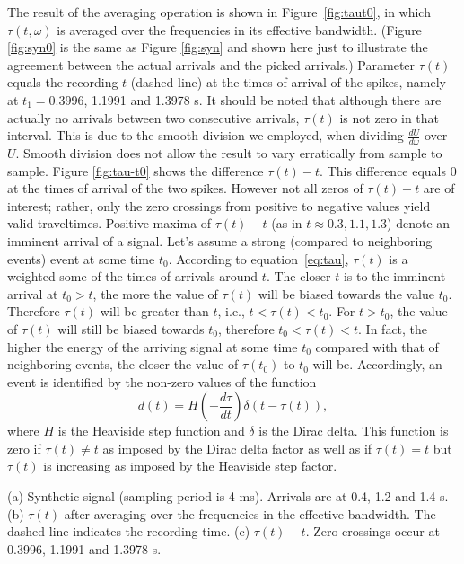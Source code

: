 The result of the averaging operation is shown in Figure~\ref{fig:taut0}, in which $\tau(t,\omega)$ is averaged over the frequencies in its effective bandwidth. (Figure \ref{fig:syn0} is the same as Figure \ref{fig:syn} and shown here just to illustrate the agreement between the actual arrivals and the picked arrivals.) Parameter $\tau(t)$ equals the recording $t$ (dashed line) at the times of arrival of the spikes, namely at $t_1=0.3996$, 1.1991 and 1.3978 s. It should be noted that although there are actually no arrivals between two consecutive arrivals, $\tau(t)$ is not zero in that interval. This is due to the smooth division we employed, when dividing $\frac{dU}{d\omega}$ over $U$. Smooth division does not allow the result to vary erratically from sample to sample. 
Figure \ref{fig:tau-t0} shows the difference $\tau(t)-t$. This difference equals 0 at the times of arrival of the two spikes. 
However not all zeros of $\tau(t)-t$ are of interest; rather, only the zero crossings from positive to negative values yield valid traveltimes. Positive maxima of $\tau(t)-t$ (as in $t\approx0.3, 1.1, 1.3$) denote an imminent arrival of a signal. Let's assume a strong (compared to neighboring events) event at some time $t_0$. According to equation~\ref{eq:tau}, $\tau(t)$ is a weighted some of the times of arrivals around $t$. The closer $t$ is to the imminent arrival at $t_0>t$, the more the value of $\tau(t)$ will be biased towards the value $t_0$. Therefore $\tau(t)$ will be greater than $t$, i.e., $t<\tau(t)<t_0$. For $t>t_0$, the value of $\tau(t)$ will still be biased towards $t_0$, therefore $t_0<\tau(t)<t$. In fact, the higher the energy of the arriving signal at some time $t_0$ compared with that of neighboring events, the closer the value of $\tau(t_0)$ to $t_0$ will be. 
Accordingly, an event is identified by the non-zero values of the function 
\begin{equation}
   d(t) = H\left(-\frac{d\tau}{dt}\right) \delta(t-\tau(t)),\label{eq:attr}
\end{equation}
where $H$ is the Heaviside step function and $\delta$ is the Dirac delta. This function is zero if $\tau(t)\neq t$ as imposed by the Dirac delta factor as well as if $\tau(t)=t$ but $\tau(t)$ is increasing as imposed by the Heaviside step factor.


{(a) Synthetic signal (sampling period is 4 ms). Arrivals are at 0.4, 1.2 and 1.4 s. 
 (b) $\tau(t)$ after averaging over the frequencies in the effective bandwidth. The dashed line indicates the recording time. 
 (c) $\tau(t)-t$. Zero crossings occur at 0.3996, 1.1991 and 1.3978 s.}%


